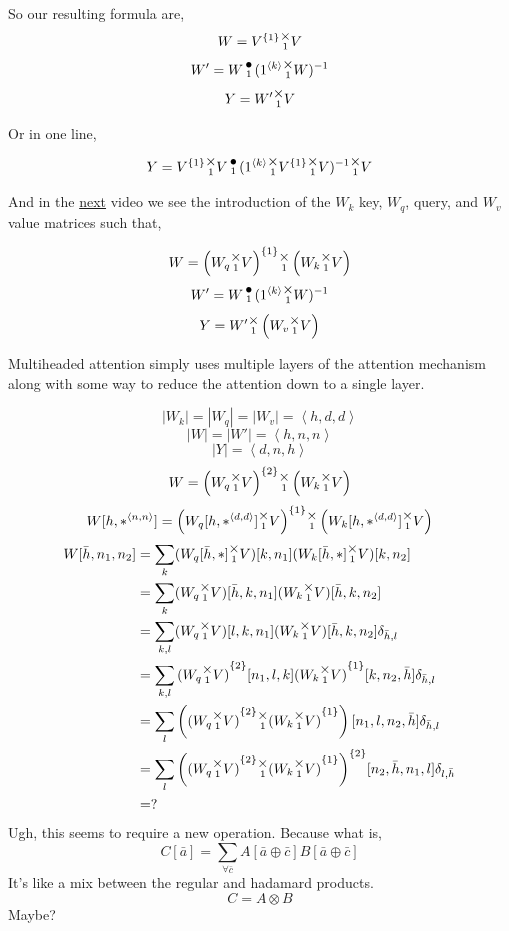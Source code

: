\documentclass[12pt]{book}
\theoremstyle{plain}
\theoremstyle{definition}
\theoremstyle{ppart}
\theoremstyle{case}
\theoremstyle{solution}
\newcommand{\mmult}[1]{\text{\raisebox{1ex}{$\underset{#1}{\times}$}}}
\newcommand{\dmult}[1]{\text{\raisebox{1ex}{$\underset{#1}{\,\bullet\,}$}}}
\newcommand{\shape}[1]{\left|#1\right|}
\newcommand{\transpose}[2]{{#1}^{\{#2\}}}
\begin{document}
\begin{appendices}
So our resulting formula are,
\[ W = \transpose{V}{1} \mmult{1} V \]
\[ W' = W \dmult{1} (1^{\left<k\right>} \mmult{1} W)^{-1} \]
\[ Y = W' \mmult{1} V \]

Or in one line,

\[ Y = \transpose{V}{1} \mmult{1} V \dmult{1} (1^{\left<k\right>} \mmult{1} \transpose{V}{1} \mmult{1} V)^{-1} \mmult{1} V \]

\pagebreak

And in the \href{https://www.youtube.com/watch?v=tIvKXrEDMhk}{next} video we see the introduction
of the $W_k$ key, $W_q$, query, and $W_v$ value matrices such that,

\[ W = \transpose{\left(W_q \mmult{1} V\right)}{1} \mmult{1} \left(W_k \mmult{1} V\right) \]
\[ W' = W \dmult{1} (1^{\left<k\right>} \mmult{1} W)^{-1} \]
\[ Y = W' \mmult{1} \left(W_v \mmult{1} V \right) \]

Multiheaded attention simply uses multiple layers of the attention mechanism along with some way to 
reduce the attention down to a single layer.

\[ \shape{W_k} = \shape{W_q} = \shape{W_v} = \left<h,d,d\right> \]
\[ \shape{W} = \shape{W'} = \left<h,n,n\right> \]
\[ \shape{Y} = \left<d,n,h\right> \]
\[ W = \transpose{\left(W_q \mmult{1} V\right)}{2} \mmult{1} \left(W_k \mmult{1} V\right) \]
\[ W[h,*^{\left<n,n\right>}] = \transpose{\left(W_q[h,*^{\left<d,d\right>}] \mmult{1} V\right)}{1} \mmult{1} \left(W_k[h,*^{\left<d,d\right>}] \mmult{1} V\right) \]
\begin{align*}
  W[\bar{h}, n_1, n_2]
  &=
  \sum_k
  (W_q[\bar{h},*] \mmult{1} V)[k, n_1]
  (W_k[\bar{h},*] \mmult{1} V)[k, n_2] \\
  &=
  \sum_{k}
  (W_q \mmult{1} V)[\bar{h}, k, n_1]
  (W_k \mmult{1} V)[\bar{h}, k, n_2] \\
  &=
  \sum_{k,l}
  (W_q \mmult{1} V)[l, k, n_1]
  (W_k \mmult{1} V)[\bar{h}, k, n_2]
  \delta_{\bar{h},l} \\
  &=
  \sum_{k,l}
  \transpose{(W_q \mmult{1} V)}{2}[n_1, l, k]
  \transpose{(W_k \mmult{1} V)}{1}[k, n_2, \bar{h}]
  \delta_{\bar{h},l} \\
  &=
  \sum_{l}
  \left(
    \transpose{(W_q \mmult{1} V)}{2}
    \mmult{1}
    \transpose{(W_k \mmult{1} V)}{1}
  \right)[n_1, l, n_2, \bar{h}] 
  \delta_{\bar{h},l} \\
  &=
  \sum_{l}
  \transpose{\left(
    \transpose{(W_q \mmult{1} V)}{2}
    \mmult{1}
    \transpose{(W_k \mmult{1} V)}{1}
  \right)}{2}[n_2, \bar{h}, n_1, l] 
  \delta_{l, \bar{h}} \\
  &=
  ?
\end{align*}
Ugh, this seems to require a new operation. Because what is,
\[ C[\bar{a}] = \sum_{\forall \bar{c}} A[\bar{a} \oplus \bar{c}] B[\bar{a} \oplus \bar{c}] \]
It's like a mix between the regular and hadamard products.
\[ C = A \otimes B \]
Maybe?

\end{appendices}



\end{document}
